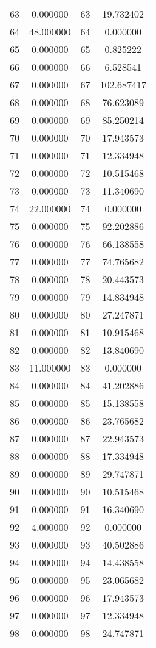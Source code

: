 \documentclass[12pt]{article}
\begin{document}
\begin{longtable}{@{}cccc@{}}
63 & 0.000000 & 63 & 19.732402 \\
64 & 48.000000 & 64 & 0.000000 \\
65 & 0.000000 & 65 & 0.825222 \\
66 & 0.000000 & 66 & 6.528541 \\
67 & 0.000000 & 67 & 102.687417 \\
68 & 0.000000 & 68 & 76.623089 \\
69 & 0.000000 & 69 & 85.250214 \\
70 & 0.000000 & 70 & 17.943573 \\
71 & 0.000000 & 71 & 12.334948 \\
72 & 0.000000 & 72 & 10.515468 \\
73 & 0.000000 & 73 & 11.340690 \\
74 & 22.000000 & 74 & 0.000000 \\
75 & 0.000000 & 75 & 92.202886 \\
76 & 0.000000 & 76 & 66.138558 \\
77 & 0.000000 & 77 & 74.765682 \\
78 & 0.000000 & 78 & 20.443573 \\
79 & 0.000000 & 79 & 14.834948 \\
80 & 0.000000 & 80 & 27.247871 \\
81 & 0.000000 & 81 & 10.915468 \\
82 & 0.000000 & 82 & 13.840690 \\
83 & 11.000000 & 83 & 0.000000 \\
84 & 0.000000 & 84 & 41.202886 \\
85 & 0.000000 & 85 & 15.138558 \\
86 & 0.000000 & 86 & 23.765682 \\
87 & 0.000000 & 87 & 22.943573 \\
88 & 0.000000 & 88 & 17.334948 \\
89 & 0.000000 & 89 & 29.747871 \\
90 & 0.000000 & 90 & 10.515468 \\
91 & 0.000000 & 91 & 16.340690 \\
92 & 4.000000 & 92 & 0.000000 \\
93 & 0.000000 & 93 & 40.502886 \\
94 & 0.000000 & 94 & 14.438558 \\
95 & 0.000000 & 95 & 23.065682 \\
96 & 0.000000 & 96 & 17.943573 \\
97 & 0.000000 & 97 & 12.334948 \\
98 & 0.000000 & 98 & 24.747871 \\

\end{longtable}
\end{document}
